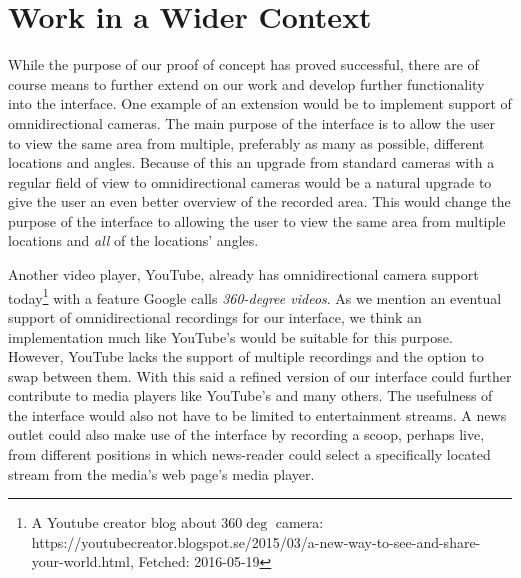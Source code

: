 \section{Work in a Wider Context}
\label{sec:workinawidercontext}
While the purpose of our proof of concept has proved successful, there are of course means to further extend on our work and develop further functionality into the interface. One example of an extension would be to implement support of omnidirectional cameras. The main purpose of the interface is to allow the user to view the same area from multiple, preferably as many as possible, different locations and angles. Because of this an upgrade from standard cameras with a regular field of view to omnidirectional cameras would be a natural upgrade to give the user an even better overview of the recorded area. This would change the purpose of the interface to allowing the user to view the same area from multiple locations and \textit{all} of the locations’ angles.

Another video player, YouTube, already has omnidirectional camera support today\footnote{A Youtube creator blog about 360$\deg$ camera: https://youtubecreator.blogspot.se/2015/03/a-new-way-to-see-and-share-your-world.html, Fetched: 2016-05-19} with a feature Google calls \textit{360-degree videos}. As we mention an eventual support of omnidirectional recordings for our interface, we think an implementation much like YouTube’s would be suitable for this purpose. However, YouTube lacks the support of multiple recordings and the option to swap between them. With this said a refined version of our interface could further contribute to media players like YouTube’s and many others. The usefulness of the interface would also not have to be limited to entertainment streams. A news outlet could also make use of the interface by recording a scoop, perhaps live, from different positions in which news-reader could select a specifically located stream from the media’s web page’s media player.

